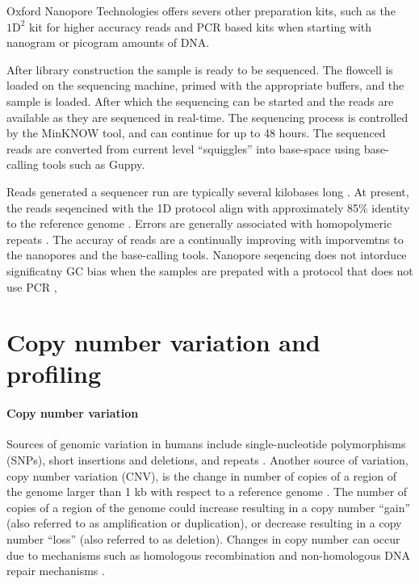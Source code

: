 Oxford Nanopore Technologies offers severs other preparation kits, such
as the $\text{1D}^2$ kit for higher accuracy reads and PCR based kits when
starting with nanogram or picogram amounts of DNA.

After library construction the sample is ready to be sequenced. The
flowcell is loaded on the sequencing machine, primed with the appropriate
buffers, and the sample is loaded. After which the sequencing can be
started and the reads are available as they are sequenced in real-time.
%
The sequencing process is controlled by the MinKNOW tool, and can
continue for up to 48 hours.
The sequenced reads are converted from current level ``squiggles'' into
base-space using base-calling tools such as Guppy.

Reads generated a sequencer run are typically several kilobases long
\citep{}.
At present, the reads seqencined with the 1D protocol align
with approximately 85\% identity to the reference genome \citep{}.
Errors are generally associated with homopolymeric repeats \citep{}.
The accuray of reads are a continually improving with imporvemtns to the
nanopores and the base-calling tools.
Nanopore seqencing does not intorduce significatny GC bias when the
samples are prepated with a protocol that does not use PCR \cite{},


\section{Copy number variation and profiling}
\paragraph{Copy number variation}
Sources of genomic variation in humans include
single-nucleotide polymorphisms (SNPs), short insertions and deletions, and
repeats \citep{}.
Another source of variation, copy number variation (CNV), is the change in
number of copies of a region of the genome larger than 1 kb with
respect to a reference genome
\citep{redon2006global,feuk2006structural}.  The number of copies of a
region of the genome could increase resulting in a copy number ``gain''
(also referred to as amplification or duplication), or decrease resulting in a
copy number ``loss'' (also referred to as deletion).
Changes in copy number can occur due to mechanisms such as homologous
recombination and non-homologous DNA repair mechanisms
\citep{hastings2009mechanisms,van2011origins,stankiewicz2010structural}.

